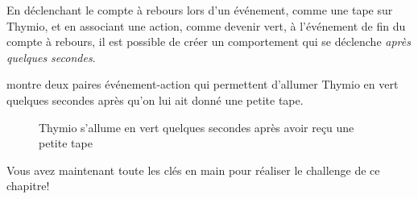 En déclenchant le compte à rebours lors d'un événement, comme une tape sur Thymio, et en associant une action, comme devenir vert, à l'événement de fin du compte à rebours, il est possible de créer un comportement qui se déclenche \textit{après quelques secondes}.

 montre deux paires événement-action qui permettent d'allumer Thymio en vert quelques secondes après qu'on lui ait donné une petite tape.

\begin{figure}
\begin{center}
\caption{Thymio s'allume en vert quelques secondes après avoir reçu une petite tape}\label{fig.paire-timer}
\end{center}
\end{figure}

Vous avez maintenant toute les clés en main pour réaliser le challenge de ce chapitre!
